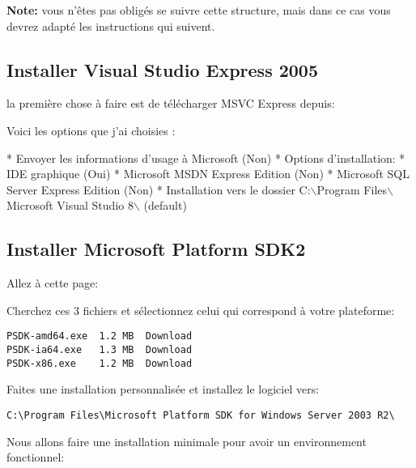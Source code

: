 \textbf{Note:} vous n'\^etes pas oblig\'es se suivre cette structure, mais dans ce cas vous devrez adapt\'e les instructions qui suivent.

\subsection{Installer Visual Studio Express 2005}
la premi\`ere chose \`a faire est de t\'el\'echarger MSVC Express depuis:


Voici les options que j'ai choisies :

 * Envoyer les informations d'usage \`a Microsoft (Non)
 * Options d'installation:
   * IDE  graphique                      (Oui)
   * Microsoft MSDN Express Edition        (Non)
   * Microsoft SQL Server Express Edition  (Non)
 * Installation vers le dossier C:$\backslash$Program Files$\backslash$Microsoft Visual
Studio 8$\backslash$   (default)

\subsection{Installer Microsoft Platform SDK2}
Allez \`a cette page:


Cherchez ces 3 fichiers et s\'electionnez celui qui correspond \`a votre plateforme:

\begin{verbatim}
PSDK-amd64.exe  1.2 MB  Download 
PSDK-ia64.exe   1.3 MB  Download 
PSDK-x86.exe    1.2 MB  Download
\end{verbatim}

Faites une installation personnalis\'ee et installez le logiciel vers:

\begin{verbatim}
C:\Program Files\Microsoft Platform SDK for Windows Server 2003 R2\
\end{verbatim}

Nous allons faire une installation minimale pour avoir un environnement fonctionnel:

